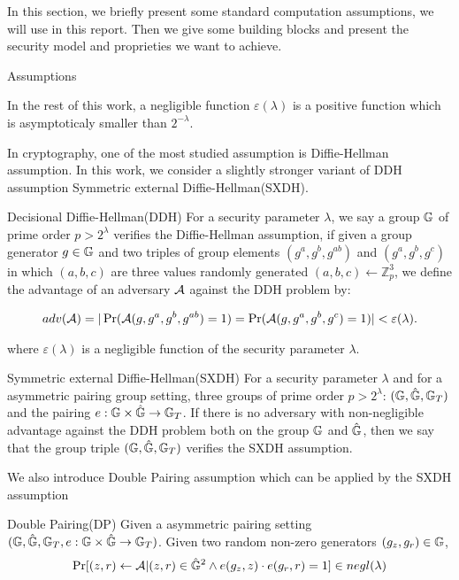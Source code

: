 In this section, we briefly present some standard computation assumptions, we will use in this report.  
Then we give some building blocks and present the security model and proprieties we want to achieve.

\begin{subsection}{Assumptions}

  In the rest of this work, a negligible function $\varepsilon(\lambda)$ is a positive function which is asymptoticaly smaller than $2^{-\lambda}$.
  
  In cryptography, one of the most studied assumption is Diffie-Hellman assumption. In this work, we consider a slightly stronger variant of DDH assumption Symmetric external Diffie-Hellman(SXDH).

  \begin{myDef}{Decisional Diffie-Hellman(DDH)}
    For a security parameter $\lambda$, we say a group $\mathbb{G}$ of prime order $p>2^{\lambda}$ verifies the Diffie-Hellman assumption, if given a group generator $g \in \mathbb{G}$ and two triples of group elements $(g^a, g^b, g^{ab})$ and $(g^a, g^b, g^c)$ in which $(a, b, c)$ are three values randomly generated  $(a, b, c) \gets \mathbb{Z}_p^3$, we define the advantage of an adversary $\mathcal{A}$ against the DDH problem by:

    \begin{align*}
      adv(\mathcal{A}) = |\operatorname{Pr}(\mathcal{A}(g, g^a, g^b, g^{ab}) = 1) = \operatorname{Pr}(\mathcal{A}(g, g^a, g^b, g^c) = 1)| < \varepsilon(\lambda).
    \end{align*}

    where $\varepsilon(\lambda)$ is a negligible function of the security parameter $\lambda$.
  \end{myDef}

  \begin{myDef}{Symmetric external Diffie-Hellman(SXDH)}
    For a security parameter $\lambda$ and for a asymmetric pairing group setting, three groups of prime order $p>2^\lambda$: $(\mathbb{G}, \hat{\mathbb{G}}, \mathbb{G}_T)$ and the pairing $e: \mathbb{G} \times \hat{\mathbb{G}} \to \mathbb{G}_T$. If there is no adversary with non-negligible advantage against the DDH problem both on the group $\mathbb{G}$ and $\hat{\mathbb{G}}$, then we say that the group triple $(\mathbb{G}, \hat{\mathbb{G}}, \mathbb{G}_T)$ verifies the SXDH assumption.
  \end{myDef}

  We also introduce Double Pairing assumption which can be applied by the SXDH assumption
  
  \begin{myDef}{Double Pairing(DP)}
    Given a asymmetric pairing setting $(\mathbb{G}, \hat{\mathbb{G}}, \mathbb{G}_T, e:\mathbb{G} \times \hat{\mathbb{G}} \to \mathbb{G}_T)$. Given two random non-zero generators $(g_z, g_r) \in \mathbb{G}$,
    \begin{align*}
      \operatorname{Pr}[(z, r) \gets \mathcal{A}| (z, r)\in \hat{\mathbb{G}}^2 \wedge e(g_z, z) \cdot e(g_r, r) = 1] \in negl(\lambda)
    \end{align*}
  \end{myDef}


\end{subsection}
